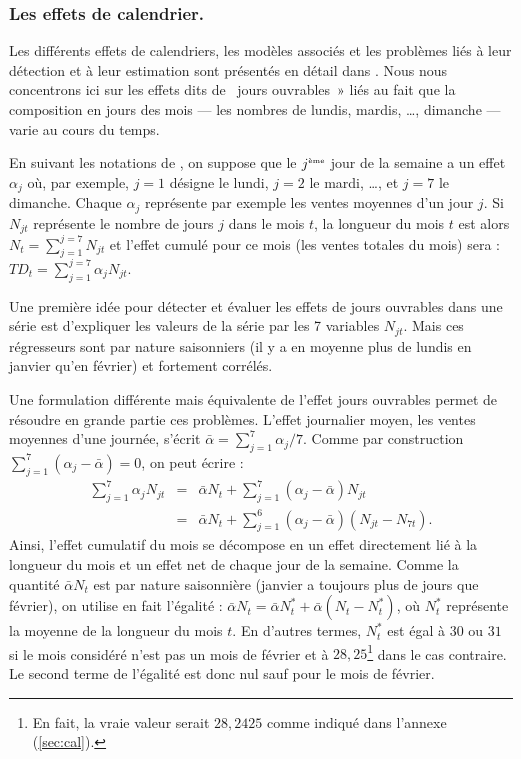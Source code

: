 \documentclass[12pt, a4paper, french]{article}
\begin{document}
\subsubsection{Les effets de calendrier.}

Les différents effets de calendriers, les modèles associés et les problèmes liés à leur détection et à leur estimation sont présentés en détail dans \cite{L2018}. Nous nous concentrons ici sur les effets dits de \og~jours ouvrables~» liés au fait que la composition en jours des mois --- les nombres de lundis, mardis, \dots, dimanche --- varie au cours du temps.

En suivant les notations de \cite{FMBOC1998}, on suppose que le $j^{\mbox{\tiny {\`{e}me}}}$ jour de la semaine a un effet $\alpha_j$ où, par exemple, $j=1$ désigne le lundi, $j=2$ le mardi, \dots, et $j=7$ le dimanche. Chaque $\alpha_j$ représente par exemple les ventes moyennes d'un jour $j$. Si $N_{jt}$ représente le nombre de jours $j$ dans le mois $t$, la longueur du mois $t$ est alors $N_t = \sum_{j=1}^{j=7} N_{jt}$ et l'effet cumulé pour ce mois (les ventes totales du mois) sera :
$TD_t = \sum_{j=1}^{j=7} \alpha_j N_{jt}$.

Une première idée pour détecter et évaluer les effets de jours ouvrables dans une série est d'expliquer les valeurs de la série par les 7 variables $N_{jt}$. Mais ces régresseurs sont par nature saisonniers (il y a en moyenne plus de lundis en janvier qu'en février) et fortement corrélés. 

Une formulation différente mais équivalente de l'effet jours ouvrables permet de résoudre en grande partie ces problèmes. L'effet journalier moyen, les ventes moyennes d'une journée, s'écrit $\bar{\alpha} = \sum_{j=1}^7 \alpha_j /7$. 
Comme par construction $\sum_{j=1}^7 \left(\alpha_j-\bar{\alpha}\right) = 0$, on peut écrire :
\begin{eqnarray*}
\sum_{j=1}^7 \alpha_j N_{jt} & = & \bar{\alpha}N_t + \sum_{j=1}^7 \left(\alpha_j-\bar{\alpha}\right) N_{jt} \nonumber \\
& = &  \bar{\alpha}N_t + \sum_{j=1}^6 \left(\alpha_j-\bar{\alpha}\right) \left(N_{jt} - N_{7t}\right).
\end{eqnarray*}
Ainsi, l'effet cumulatif du mois se décompose en un effet directement lié à la longueur du mois et un effet net de chaque jour de la semaine. Comme la quantité $\bar{\alpha}N_t$ est par nature saisonnière (janvier a toujours plus de jours que février), on utilise en fait l'égalité : $\bar{\alpha}N_t = \bar{\alpha}N_t^* + \bar{\alpha}\left(N_t-N_t^*\right)$, où $N_t^*$
représente la moyenne de la longueur du mois $t$. En d'autres termes, $N_t^*$  est égal à $30$ ou $31$ si le mois considéré n'est pas un mois de février et à $28,25$\footnote{En fait, la vraie valeur serait $28,2425$ comme indiqué dans l'annexe (\ref{sec:cal}).} dans le cas contraire. Le second terme de l'égalité est donc nul sauf pour le mois de février.
\end{document}
